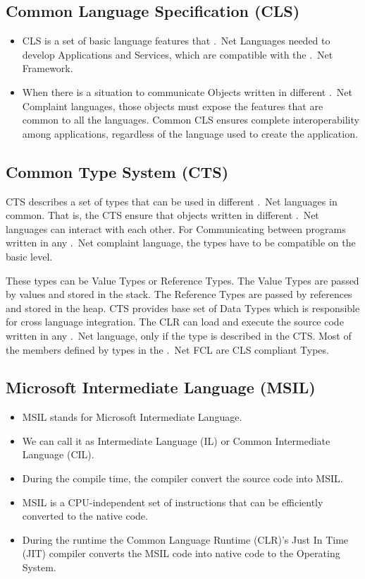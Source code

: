 \subsection*{Common Language Specification (CLS)}
\begin{itemize}
	\item CLS is a set of basic language features that .\ Net Languages needed to develop Applications and Services, which are compatible with the .\ Net Framework.
	\item When there is a situation to communicate Objects written in different .\ Net Complaint languages, those objects must expose the features that are common to all the languages. 
	Common CLS ensures complete interoperability among applications, regardless of the language used to create the application.
	
\end{itemize}


\subsection*{Common Type System (CTS)}
CTS describes a set of types that can be used in different .\ Net languages in common. That is, the CTS ensure that objects written in different .\ Net languages can interact with each other. For Communicating between programs written in any .\ Net complaint language, the types have to be compatible on the basic level. 

These types can be Value Types or Reference Types. The Value Types are passed by values and stored in the stack. The Reference Types are passed by references and stored in the heap. CTS provides base set of Data Types which is responsible for cross language integration. The CLR can load and execute the source code written in any .\ Net language, only if the type is described in the CTS. Most of the members defined by types in the .\ Net FCL are CLS compliant Types.


\subsection*{Microsoft Intermediate Language (MSIL)}
\begin{itemize}
	\item MSIL stands for Microsoft Intermediate Language. 
	\item We can call it as Intermediate Language (IL) or Common Intermediate Language (CIL). 
	\item During the compile time, the compiler convert the source code into MSIL. 
	\item MSIL is a CPU-independent set of instructions that can be efficiently converted to the native code. 
	\item During the runtime the Common Language Runtime (CLR)'s Just In Time (JIT) compiler converts the MSIL code into native code to the Operating System.
\end{itemize}

